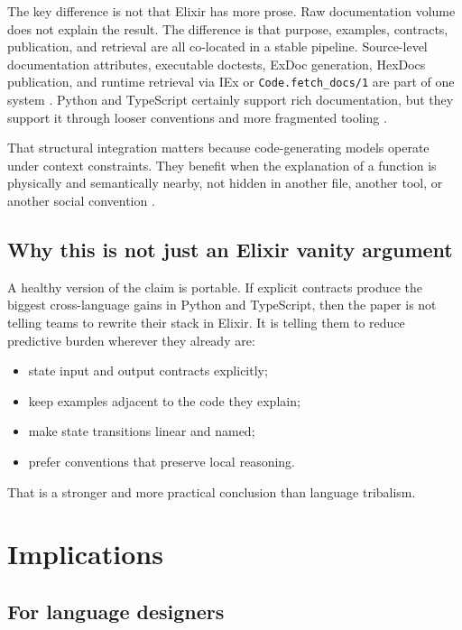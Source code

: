 \documentclass[11pt]{article}
\newcommand{\elixir}{Elixir}
\newcommand{\pythonlang}{Python}
\newcommand{\tslang}{TypeScript}
\begin{document}
The key difference is not that \elixir{} has more prose. Raw documentation volume does not explain the result. The difference is that purpose, examples, contracts, publication, and retrieval are all co-located in a stable pipeline. Source-level documentation attributes, executable doctests, ExDoc generation, HexDocs publication, and runtime retrieval via IEx or \texttt{Code.fetch\_docs/1} are part of one system \cite{writingdocs,codefetchdocs,exunitdoctest,exdoc,hexdocs}. Python and TypeScript certainly support rich documentation, but they support it through looser conventions and more fragmented tooling \cite{pydoc,pydoctest,tsjsdoc,typedoc}.

That structural integration matters because code-generating models operate under context constraints. They benefit when the explanation of a function is physically and semantically nearby, not hidden in another file, another tool, or another social convention \cite{zachdaniel}.

\subsection{Why this is not just an Elixir vanity argument}

A healthy version of the claim is portable. If explicit contracts produce the biggest cross-language gains in \pythonlang{} and \tslang{}, then the paper is not telling teams to rewrite their stack in \elixir{}. It is telling them to reduce predictive burden wherever they already are:
\begin{itemize}
  \item state input and output contracts explicitly;
  \item keep examples adjacent to the code they explain;
  \item make state transitions linear and named;
  \item prefer conventions that preserve local reasoning.
\end{itemize}

That is a stronger and more practical conclusion than language tribalism.

\section{Implications}

\subsection{For language designers}
\end{document}
